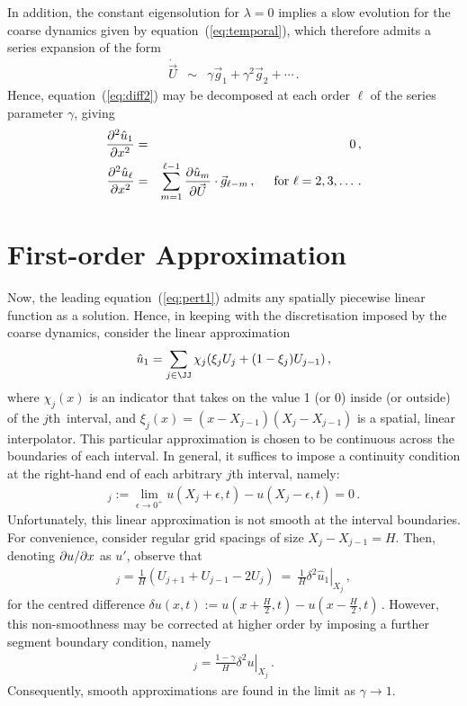 \documentclass[12pt,a5paper]{article}
\begin{document}
In addition, the constant eigensolution for $\lambda=0$ implies a slow evolution for the coarse dynamics given by 
equation~(\ref{eq:temporal}), which therefore admits a series expansion of the form
\begin{eqnarray}
	\dot{{\vec U}} & \sim & \gamma {\vec g}_1+\gamma^2 {\vec g}_2+\cdots\,.
\end{eqnarray}
Hence, equation~(\ref{eq:diff2}) may be decomposed at each order 
$\ell$ of the series parameter $\gamma$, giving
\begin{eqnarray}
   \DD {x}{\hat{u}_1} & = & 0\,, \label{eq:pert1}
\\
  \DD {x}{\hat{u}_\ell} & = & \sum_{m=1}^{\ell-1}\D {\vec U}{\hat{u}_m}\cdot{\vec g}_{\ell-m}\,,
\hspace*{5mm}\mbox{for }\ell=2,3,\ldots\,.
\label{eq:pert_ell}
\end{eqnarray}


\section{First-order Approximation}
Now,  the leading equation~(\ref{eq:pert1}) admits any spatially piecewise linear function as a solution. 
Hence, in keeping
with the discretisation imposed by the coarse dynamics, 
consider the linear approximation
\begin{eqnarray}
   \hat{u}_1 = \sum_{j\in\JJ}\chi_j(\xi_j U_j+(1-\xi_j)U_{j-1})\,,
\label{eq:uhat1}
\end{eqnarray}
where $\chi_j(x)$ is an indicator that takes on the value 1 (or 0) inside (or outside) of the $j$th~interval, and 
$\xi_j(x)=({x-X_{j-1}})({X_j-X_{j-1}})$ is a spatial, linear interpolator.
This particular approximation is chosen to be continuous across the boundaries of each interval. 
In general, it suffices 
to impose a continuity condition at the right-hand end of each arbitrary $j$th interval, namely:
\begin{eqnarray}
   [u]_j := \lim_{\epsilon\rightarrow 0^{+}} u(X_j+\epsilon,t)-u(X_j-\epsilon,t)= 0\,.
\label{eq:cont-cond}
\end{eqnarray}
Unfortunately, this linear approximation is not smooth at the interval boundaries. 
For convenience, consider regular grid spacings of size 
$X_j-X_{j-1}=H$. Then, denoting $\D xu$ as $u'$, observe that
\begin{eqnarray}
   [\hat{u}'_1]_j = \frac{1}{H}(U_{j+1}+U_{j-1}-2U_j)~=~\frac{1}{H}\left.\delta^{2}\hat{u}_1\right|_{X_j}\,,
\end{eqnarray}
for the centred difference $\delta u(x,t):= u(x+\frac{H}{2},t)-u(x-\frac{H}{2},t)$\,.
However, this non-smoothness may be corrected at higher order by imposing a further segment boundary condition, namely
\begin{eqnarray}
   [u']_j = \frac{1-\gamma}{H}\left.\delta^{2}u\right|_{X_j}\,.
\label{eq:smooth-cond}
\end{eqnarray}
Consequently, smooth approximations are found in the limit as $\gamma\rightarrow 1$.
\end{document}
